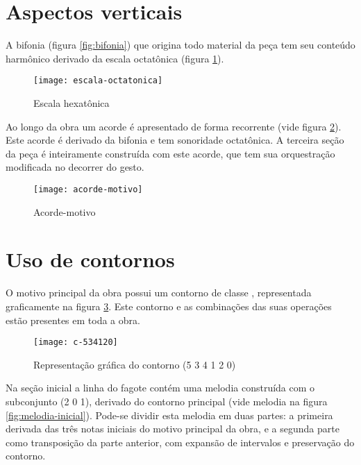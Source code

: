 \section{Aspectos verticais}
\label{sec:aspectos-verticais}

A bifonia (figura \ref{fig:bifonia}) que origina todo material da peça
tem seu conteúdo harmônico derivado da escala octatônica (figura
\ref{fig:escala-octatonica}).

\begin{figure}
  \centering
  \texttt{[image: escala-octatonica]}
  \caption{Escala hexatônica}
  \label{fig:escala-octatonica}
\end{figure}

Ao longo da obra um acorde é apresentado de forma recorrente (vide
figura \ref{fig:acorde-motivo}). Este acorde é derivado da bifonia e
tem sonoridade octatônica. A terceira seção da peça é inteiramente
construída com este acorde, que tem sua orquestração modificada no
decorrer do gesto.

\begin{figure}
  \centering
  \texttt{[image: acorde-motivo]}
  \caption{Acorde-motivo}
  \label{fig:acorde-motivo}
\end{figure}

\section{Uso de contornos}
\label{sec:uso-de-contornos}

O motivo principal da obra possui um contorno de classe \contpr{},
representada graficamente na figura \ref{fig:534120}. Este contorno e
as combinações das suas operações estão presentes em toda a obra.

\begin{figure}
  \centering
  \texttt{[image: c-534120]}
  \caption{Representação gráfica do contorno (5 3 4 1 2 0)}
  \label{fig:534120}
\end{figure}

Na seção inicial a linha do fagote contém uma melodia construída com o
subconjunto (2 0 1), derivado do contorno principal (vide melodia na
figura \ref{fig:melodia-inicial}). Pode-se dividir esta melodia em
duas partes: a primeira derivada das três notas iniciais do motivo
principal da obra, e a segunda parte como transposição da parte
anterior, com expansão de intervalos e preservação do contorno.

